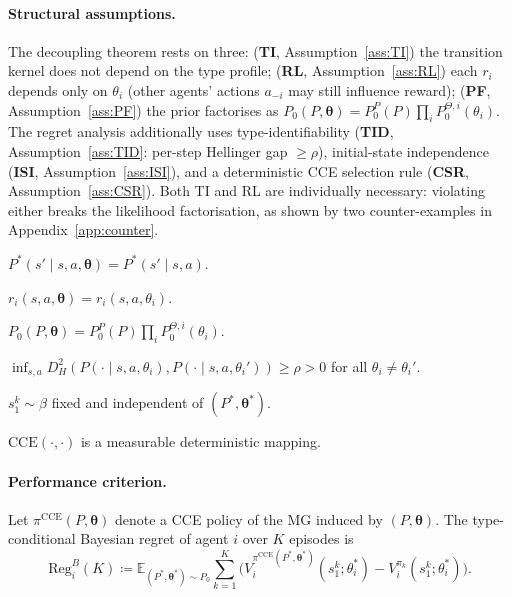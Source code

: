 \paragraph{Structural assumptions.} The decoupling theorem rests on three:
(\textbf{TI}, Assumption~\ref{ass:TI}) the transition kernel does not depend on the type profile;
(\textbf{RL}, Assumption~\ref{ass:RL}) each $r_i$ depends only on $\theta_i$ (other agents' actions $a_{-i}$ may still influence reward);
(\textbf{PF}, Assumption~\ref{ass:PF}) the prior factorises as $P_0(P,\boldsymbol\theta)=P_0^P(P)\prod_i P_0^{\Theta,i}(\theta_i)$.
The regret analysis additionally uses type-identifiability (\textbf{TID}, Assumption~\ref{ass:TID}: per-step Hellinger gap $\geq\rho$), initial-state independence (\textbf{ISI}, Assumption~\ref{ass:ISI}), and a deterministic CCE selection rule (\textbf{CSR}, Assumption~\ref{ass:CSR}). Both TI and RL are individually necessary: violating either breaks the likelihood factorisation, as shown by two counter-examples in Appendix~\ref{app:counter}.

\begin{assumption}[TI]\label{ass:TI}$P^*(s'\!\mid\! s,a,\boldsymbol\theta)=P^*(s'\!\mid\! s,a)$.\end{assumption}
\begin{assumption}[RL]\label{ass:RL}$r_i(s,a,\boldsymbol\theta)=r_i(s,a,\theta_i)$.\end{assumption}
\begin{assumption}[PF]\label{ass:PF}$P_0(P,\boldsymbol\theta)=P_0^P(P)\prod_i P_0^{\Theta,i}(\theta_i)$.\end{assumption}
\begin{assumption}[TID]\label{ass:TID}$\inf_{s,a}D_H^2(P(\cdot\!\mid\! s,a,\theta_i),P(\cdot\!\mid\! s,a,\theta_i'))\geq\rho>0$ for all $\theta_i\!\neq\!\theta_i'$.\end{assumption}
\begin{assumption}[ISI]\label{ass:ISI}$s_1^k\sim\beta$ fixed and independent of $(P^*,\boldsymbol\theta^*)$.\end{assumption}
\begin{assumption}[CSR]\label{ass:CSR}$\mathrm{CCE}(\cdot,\cdot)$ is a measurable deterministic mapping.\end{assumption}

\paragraph{Performance criterion.} Let $\pi^{\mathrm{CCE}}(P,\boldsymbol\theta)$ denote a CCE policy of the MG induced by $(P,\boldsymbol\theta)$. The type-conditional Bayesian regret of agent $i$ over $K$ episodes is
\begin{equation}
\label{eq:regret-def}
\mathrm{Reg}_i^B(K) \!\coloneqq\! \mathbb{E}_{(P^*,\boldsymbol\theta^*)\sim P_0}\!\sum_{k=1}^K\!\Big(V_i^{\pi^{\mathrm{CCE}}(P^*,\boldsymbol\theta^*)}\!(s_1^k;\theta_i^*) - V_i^{\pi_k}(s_1^k;\theta_i^*)\Big).
\end{equation}

